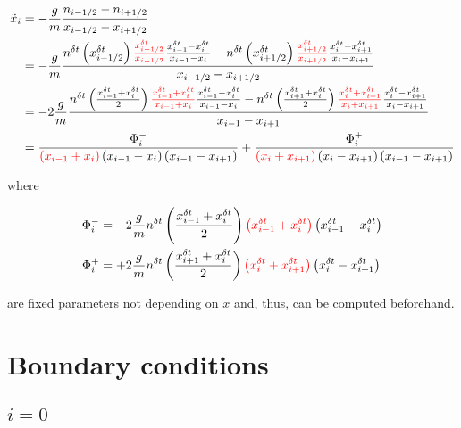 \documentclass{article}
\begin{document}
\begin{equation}
  \begin{split}
    \ddot{x}_i & =-\frac{g}{m}\frac{n_{i-1/2}-n_{i+1/2}}{x_{i-1/2}-x_{i+1/2}}\\
    & = -\frac{g}{m}\frac{n^{\delta t}\left(x^{\delta t}_{i-1/2}\right)\textcolor{red}{\frac{x^{\delta t}_{i-1/2}}{x_{i-1/2}}}\frac{x^{\delta t}_{i-1}-x^{\delta t}_i}{x_{i-1}-x_i}-n^{\delta t}\left(x^{\delta t}_{i+1/2}\right)\textcolor{red}{\frac{x^{\delta t}_{i+1/2}}{x_{i+1/2}}}\frac{x^{\delta t}_i-x^{\delta t}_{i+1}}{x_i-x_{i+1}}}{x_{i-1/2}-x_{i+1/2}}\\
    & = -2\frac{g}{m}\frac{n^{\delta t}\left(\frac{x^{\delta t}_{i-1}+x^{\delta t}_i}{2}\right)\textcolor{red}{\frac{x^{\delta t}_{i-1}+x^{\delta t}_i}{x_{i-1}+x_i}}\frac{x^{\delta t}_{i-1}-x^{\delta t}_i}{x_{i-1}-x_i}-n^{\delta t}\left(\frac{x^{\delta t}_{i+1}+x^{\delta t}_i}{2}\right)\textcolor{red}{\frac{x^{\delta t}_{i}+x^{\delta t}_{i+1}}{x_{i}+x_{i+1}}}\frac{x^{\delta t}_i-x^{\delta t}_{i+1}}{x_i-x_{i+1}}}{x_{i-1}-x_{i+1}}\\
    & = \frac{\Phi_i^-}{\textcolor{red}{\left(x_{i-1}+x_i\right)}\left(x_{i-1}-x_i\right)\left(x_{i-1}-x_{i+1}\right)}+\frac{\Phi_i^+}{\textcolor{red}{\left(x_i+x_{i+1}\right)}\left(x_i-x_{i+1}\right)\left(x_{i-1}-x_{i+1}\right)}
  \end{split}
\end{equation}


where

\begin{equation}
  \begin{split}
    \Phi_i^-&= -2\frac{g}{m}n^{\delta t}\left(\frac{x^{\delta t}_{i-1}+x^{\delta t}_i}{2}\right)
    \textcolor{red}{\left(x^{\delta t}_{i-1}+x^{\delta t}_i\right)}\left(x^{\delta t}_{i-1}-x^{\delta t}_i\right) \\
    \Phi_i^+&=+2\frac{g}{m}n^{\delta t}\left(\frac{x^{\delta t}_{i+1}+x^{\delta t}_i}{2}\right)\textcolor{red}{\left(x^{\delta t}_{i}+x^{\delta t}_{i+1}\right)}\left(x^{\delta t}_{i}-x^{\delta t}_{i+1}\right)
  \end{split}
\end{equation}


are fixed parameters not depending on $x$ and, thus, can be computed beforehand.

\section{Boundary conditions}
\subsection{$i=0$}
\end{document}
